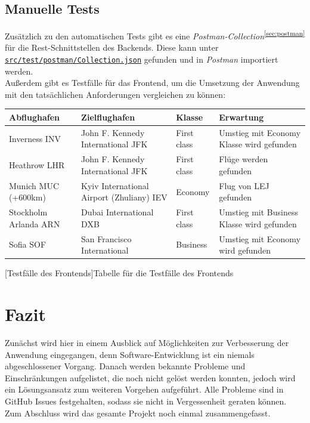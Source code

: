 \documentclass[12pt,twoside,a4paper]{article}
\begin{document}
\subsection{Manuelle Tests}
Zusätzlich zu den automatischen Tests gibt es eine \textit{Postman-Collection}\textsuperscript{\ref{sec:postman}} für die Rest-Schnittstellen des Backends. Diese kann unter \href{https://github.com/featherkraken/featherkraken/blob/master/src/test/postman/Collection.json}{\texttt{src/test/postman/Collection.json}} gefunden und in \textit{Postman} importiert werden.\\
Außerdem gibt es Testfälle für das Frontend, um die Umsetzung der Anwendung mit den tatsächlichen Anforderungen vergleichen zu können:
\begin{center}
	\captionsetup{type=figure}
	\resizebox{\textwidth}{!}
	{\begin{tabular}{ l | l | l | l }
			\textbf{Abflughafen} & \textbf{Zielflughafen} & \textbf{Klasse} & \textbf{Erwartung} \\
			\hline
			Inverness INV & John F. Kennedy International JFK & First class &  Umstieg mit Economy Klasse wird gefunden\\
			\hline
			Heathrow LHR & John F. Kennedy International JFK & First class &  Flüge werden gefunden\\
			\hline
			Munich MUC (+600km) & Kyiv International Airport (Zhuliany) IEV & Economy &  Flug von LEJ gefunden\\
			\hline
			Stockholm Arlanda ARN & Dubai International DXB & First class &  Umstieg mit Business Klasse wird gefunden\\
			\hline
			Sofia SOF & San Francisco International & Business &  Umstieg mit Economy wird gefunden\\
	\end{tabular}}
	[Testfälle des Frontends]{Tabelle für die Testfälle des Frontends}
	\label{fig:ui-tests}
\end{center}
\newpage
\section{Fazit}
Zunächst wird hier in einem Ausblick auf Möglichkeiten zur Verbesserung der Anwendung eingegangen, denn Software-Entwicklung ist ein niemals abgeschlossener Vorgang. Danach werden bekannte Probleme und Einschränkungen aufgelistet, die noch nicht gelöst werden konnten, jedoch wird ein Lösungsansatz zum weiteren Vorgehen aufgeführt. Alle Probleme sind in GitHub Issues festgehalten, sodass sie nicht in Vergessenheit geraten können. Zum Abschluss wird das gesamte Projekt noch einmal zusammengefasst.
\end{document}
